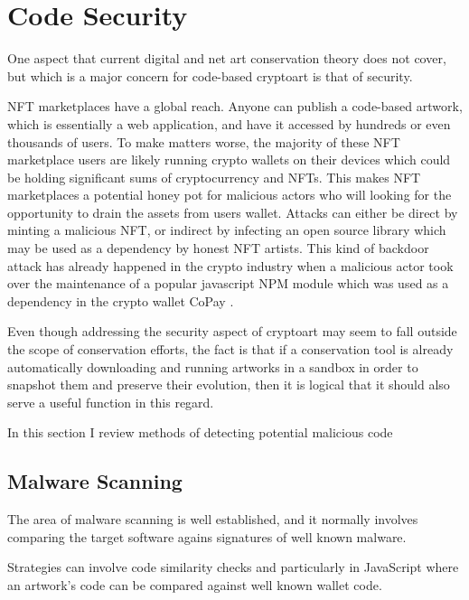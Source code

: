 \section{Code Security}

One aspect that current digital and net art conservation theory does not cover, but which is a major concern for code-based cryptoart is that of security.

NFT marketplaces have a global reach. Anyone can publish a code-based artwork, which is essentially a web application, and have it accessed by hundreds or even thousands of users. To make matters worse, the majority of these NFT marketplace users are likely running crypto wallets on their devices which could be holding significant sums of cryptocurrency and NFTs. This makes NFT marketplaces a potential honey pot for malicious actors who will looking for the opportunity to drain the assets from users wallet. Attacks can either be direct by minting a malicious NFT, or indirect by infecting an open source library which may be used as a dependency by honest NFT artists. This kind of backdoor attack has already happened in the crypto industry when a malicious actor took over the maintenance of a popular javascript NPM module which was used as a dependency in the crypto wallet CoPay \cite{haworthPopularJavaScriptDependency2018}.

Even though addressing the security aspect of cryptoart may seem to fall outside the scope of conservation efforts, the fact is that if a conservation tool is already automatically downloading and running artworks in a sandbox in order to snapshot them and preserve their evolution, then it is logical that it should also serve a useful function in this regard.

In this section I review methods of detecting potential malicious code

\subsection{Malware Scanning}

The area of malware scanning is well established, and it normally involves comparing the target software agains signatures of well known malware.


Strategies can involve code similarity checks \cite{ragkhitwetsagulComparisonCodeSimilarity2018} and particularly in JavaScript \cite{alfagehCloneDetectionTechniques2020} where an artwork's code can be compared against well known wallet code.


